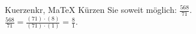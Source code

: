 \begin{MAufgabe}{Kuerzen}{kr, MaTeX}
K\"urzen Sie soweit m\"oglich: $\frac{568}{71}$.\\ 
\ifLsg\MLoesung
\quad $\frac{568}{71}=\frac{(71)\cdot(8)}{(71)\cdot(1)}=\frac{8}{1}$.\else\relax\fi
 \end{MAufgabe}